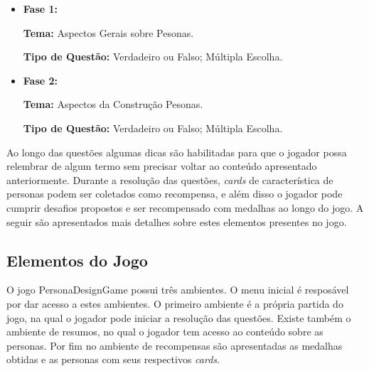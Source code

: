 \begin{itemize}
    \item \textbf{Fase 1:}
    
    \textbf{Tema:} Aspectos Gerais sobre Pesonas.
    
    \textbf{Tipo de Questão:} Verdadeiro ou Falso; Múltipla Escolha.
    
    \item  \textbf{Fase 2:} 
    
    \textbf{Tema:} Aspectos da Construção Pesonas.
    
    \textbf{Tipo de Questão:} Verdadeiro ou Falso; Múltipla Escolha.
    
\end{itemize}

{\color{textmodified}
Ao longo das questões algumas dicas são habilitadas para que o jogador possa relembrar de algum termo sem precisar voltar ao conteúdo apresentado anteriormente. Durante a resolução das questões, \textit{cards} de característica de personas podem ser coletados como recompensa, e além disso o jogador pode cumprir desafios propostos e ser recompensado com medalhas ao longo do jogo. A seguir são apresentados mais detalhes sobre estes elementos presentes no jogo.
}

\subsection{Elementos do Jogo}

{\color{textmodified}
O jogo PersonaDesignGame possui três ambientes. O menu inicial é resposável por dar acesso a estes ambientes. O primeiro ambiente é a própria partida do jogo, na qual o jogador pode iniciar a resolução das questões. Existe também o ambiente de resumos, no qual o jogador tem acesso ao conteúdo sobre as personas. Por fim no ambiente de recompensas são apresentadas as medalhas obtidas e as personas com seus respectivos \textit{cards}.
}

